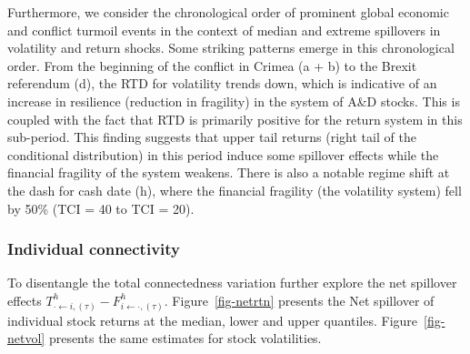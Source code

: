 \documentclass[
  letterpaper,
  DIV=11,
  numbers=noendperiod]{scrartcl}
\begin{document}
Furthermore, we consider the chronological order of prominent global
economic and conflict turmoil events in the context of median and
extreme spillovers in volatility and return shocks. Some striking
patterns emerge in this chronological order. From the beginning of the
conflict in Crimea (a + b) to the Brexit referendum (d), the RTD for
volatility trends down, which is indicative of an increase in resilience
(reduction in fragility) in the system of A\&D stocks. This is coupled
with the fact that RTD is primarily positive for the return system in
this sub-period. This finding suggests that upper tail returns (right
tail of the conditional distribution) in this period induce some
spillover effects while the financial fragility of the system weakens.
There is also a notable regime shift at the dash for cash date (h),
where the financial fragility (the volatility system) fell by 50\% (TCI
= 40 to TCI = 20).

\hypertarget{individual-connectivity}{%
\subsubsection{Individual connectivity}\label{individual-connectivity}}

To disentangle the total connectedness variation further explore the net
spillover effects
\(T_{\cdot \leftarrow i,(\tau)}^h -F_{i \leftarrow \cdot,(\tau)}^h\).
Figure~\ref{fig-netrtn} presents the Net spillover of individual stock
returns at the median, lower and upper quantiles.
Figure~\ref{fig-netvol} presents the same estimates for stock
volatilities.
\end{document}
